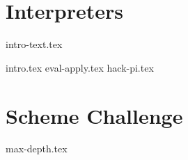\documentclass{exam}
\begin{document}
\section{Interpreters}
{intro-text.tex}
\newpage
\begin{questions}
    {intro.tex}
    {eval-apply.tex}
\newpage
    {hack-pi.tex}
\end{questions}

\section{Scheme Challenge}
\begin{questions}
{max-depth.tex}
\end{questions}

\end{document}
